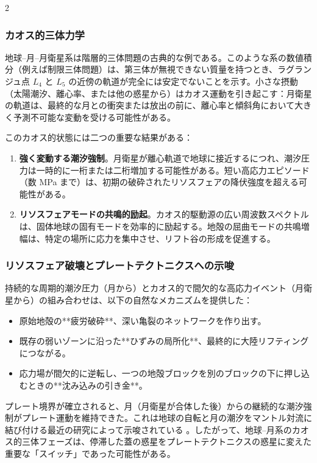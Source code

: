 \documentclass[12pt,a4paper]{article}
\begin{document}
\begin{multicols}{2}
		\subsubsection{カオス的三体力学}
		地球–月–月衛星系は階層的三体問題の古典的な例である。このような系の数値積分（例えば制限三体問題）は、第三体が無視できない質量を持つとき、ラグランジュ点 \(L_{4}\) と \(L_{5}\) の近傍の軌道が完全には安定でないことを示す。小さな摂動（太陽潮汐、離心率、または他の惑星から）はカオス運動を引き起こす：月衛星の軌道は、最終的な月との衝突または放出の前に、離心率と傾斜角において大きく予測不可能な変動を受ける可能性がある。
		
		このカオス的状態には二つの重要な結果がある：
		\begin{enumerate}
			\item \textbf{強く変動する潮汐強制}。月衛星が離心軌道で地球に接近するにつれ、潮汐圧力は一時的に一桁または二桁増加する可能性がある。短い高応力エピソード（数 MPa まで）は、初期の破砕されたリソスフェアの降伏強度を超える可能性がある。
			\item \textbf{リソスフェアモードの共鳴的励起}。カオス的駆動源の広い周波数スペクトルは、固体地球の固有モードを効率的に励起する。地殻の屈曲モードの共鳴増幅は、特定の場所に応力を集中させ、リフト谷の形成を促進する。
		\end{enumerate}
		
		\subsubsection{リソスフェア破壊とプレートテクトニクスへの示唆}
		持続的な周期的潮汐圧力（月から）とカオス的で間欠的な高応力イベント（月衛星から）の組み合わせは、以下の自然なメカニズムを提供した：
		\begin{itemize}
			\item 原始地殻の**疲労破砕**、深い亀裂のネットワークを作り出す。
			\item 既存の弱いゾーンに沿った**ひずみの局所化**、最終的に大陸リフティングにつながる。
			\item 応力場が間欠的に逆転し、一つの地殻ブロックを別のブロックの下に押し込むときの**沈み込みの引き金**。
		\end{itemize}
		
		プレート境界が確立されると、月（月衛星が合体した後）からの継続的な潮汐強制がプレート運動を維持できた。これは地球の自転と月の潮汐をマントル対流に結び付ける最近の研究によって示唆されている \cite{Rampino2021}。したがって、地球–月系のカオス的三体フェーズは、停滞した蓋の惑星をプレートテクトニクスの惑星に変えた重要な「スイッチ」であった可能性がある。
		

\end{multicols}
\end{document}
